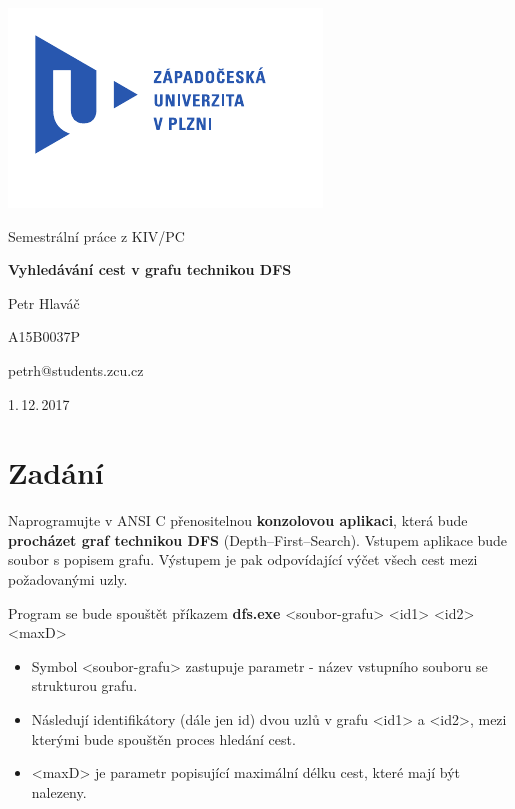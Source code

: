 \begin{titlepage}
	\vspace*{-2cm}
	{\centering\includegraphics[scale=1.0]{logo.pdf}\par}
	\centering
	\vspace*{2cm}
	{\Large Semestrální práce z KIV/PC\par}
	\vspace{1.5cm}
	{\Huge\bfseries Vyhledávání cest v grafu technikou DFS\par}
	\vspace{2cm}

	{\Large Petr Hlaváč\par}
	{\Large A15B0037P\par}
	{\Large petrh@students.zcu.cz\par}

	\vfill

	{\Large 1.\,12.\,2017}
\end{titlepage}

\tableofcontents
\thispagestyle{empty}
\clearpage

\chapter{Zadání}
Naprogramujte v ANSI C přenositelnou \textbf{konzolovou aplikaci}, která bude \textbf{procházet graf technikou DFS} (Depth--First--Search). Vstupem aplikace bude soubor s popisem grafu. Výstupem je pak odpovídající výčet všech cest mezi požadovanými uzly.

\medskip
Program se bude spouštět příkazem \textbf{dfs.exe} <soubor-grafu> <id1> <id2> <maxD>
\begin{itemize}
\item Symbol <soubor-grafu> zastupuje parametr - název vstupního souboru se strukturou grafu.
\item Následují identifikátory (dále jen id) dvou uzlů v grafu <id1> a <id2>, mezi kterými bude spouštěn proces hledání cest.
\item <maxD> je parametr popisující maximální délku cest, které mají být nalezeny.
\end{itemize}

